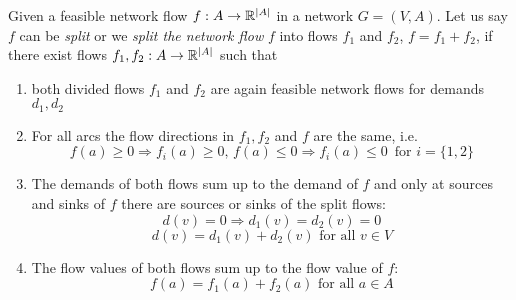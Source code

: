 \begin{definition}
Given a feasible network flow $f:A\to \mathbb{R}^{|A|}$ in a network $G=(V,A)$. Let us say $f$ can be \textit{split} or we 
\textit{split the network flow} $f$ into flows $f_1$ and $f_2$, $f=f_1+f_2$, if there exist flows $f_1, f_2:A\to 
\mathbb{R}^{|A|}$ such that 
\begin{enumerate}
 \item both divided flows $f_1$ and $f_2$ are again feasible network flows for demands $d_1, d_2$
 \item For all arcs the flow directions in $f_1, f_2$ and $f$ are the same, i.e. 
  $$f(a)\ge 0\Rightarrow f_i(a)\ge 0,\, f(a)\le 0 \Rightarrow f_i(a)\le 0 \,\textrm{ for } i=\{1,2\}$$
 \item The demands of both flows sum up to the demand of $f$ and only at sources and sinks of $f$ there are sources 
 or sinks of the split flows: 
  $$d(v)=0\Rightarrow d_1(v)=d_2(v)=0$$ $$d(v)=d_1(v)+d_2(v) \textrm{ for all }v\in V$$
 \item The flow values of both flows sum up to the flow value of $f$:$$f(a)=f_1(a)+f_2(a) \textrm{ for all }a\in A$$
\end{enumerate}
\end{definition}

